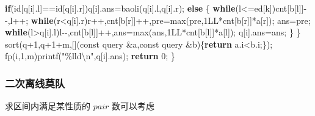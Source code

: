 \documentclass[
]{article}
\newenvironment{Shaded}{}{}
\newcommand{\AttributeTok}[1]{\textcolor[rgb]{0.49,0.56,0.16}{#1}}
\newcommand{\BuiltInTok}[1]{#1}
\newcommand{\ControlFlowTok}[1]{\textcolor[rgb]{0.00,0.44,0.13}{\textbf{#1}}}
\newcommand{\DecValTok}[1]{\textcolor[rgb]{0.25,0.63,0.44}{#1}}
\newcommand{\NormalTok}[1]{#1}
\newcommand{\SpecialCharTok}[1]{\textcolor[rgb]{0.25,0.44,0.63}{#1}}
\newcommand{\StringTok}[1]{\textcolor[rgb]{0.25,0.44,0.63}{#1}}
\begin{document}
\begin{Shaded}
\begin{Highlighting}[]
        \ControlFlowTok{if}\NormalTok{(id[q[i].l]==id[q[i].r])q[i].ans=baoli(q[i].l,q[i].r);}
        \ControlFlowTok{else}
\NormalTok{        \{}
            \ControlFlowTok{while}\NormalTok{(l\textless{}=ed[k])cnt[b[l]]{-}{-},l++;}
            \ControlFlowTok{while}\NormalTok{(r\textless{}q[i].r)r++,cnt[b[r]]++,pre=max(pre,}\DecValTok{1}\BuiltInTok{LL}\NormalTok{*cnt[b[r]]*a[r]);}
\NormalTok{            ans=pre;}
            \ControlFlowTok{while}\NormalTok{(l\textgreater{}q[i].l)l{-}{-},cnt[b[l]]++,ans=max(ans,}\DecValTok{1}\BuiltInTok{LL}\NormalTok{*cnt[b[l]]*a[l]);}
\NormalTok{            q[i].ans=ans;}
\NormalTok{        \}}
\NormalTok{    \}}
\NormalTok{    sort(q+}\DecValTok{1}\NormalTok{,q+}\DecValTok{1}\NormalTok{+m,[](}\AttributeTok{const}\NormalTok{ query \&a,}\AttributeTok{const}\NormalTok{ query \&b)\{}\ControlFlowTok{return}\NormalTok{ a.i\textless{}b.i;\});}
\NormalTok{    fp(i,}\DecValTok{1}\NormalTok{,m)printf(}\StringTok{"}\SpecialCharTok{\%lld\textbackslash{}n}\StringTok{"}\NormalTok{,q[i].ans);}
    \ControlFlowTok{return} \DecValTok{0}\NormalTok{;}
\NormalTok{\}}
\end{Highlighting}
\end{Shaded}

\hypertarget{ux4e8cux6b21ux79bbux7ebfux83abux961f}{%
\subsubsection{二次离线莫队}\label{ux4e8cux6b21ux79bbux7ebfux83abux961f}}

求区间内满足某性质的 \(pair\) 数可以考虑
\end{document}
